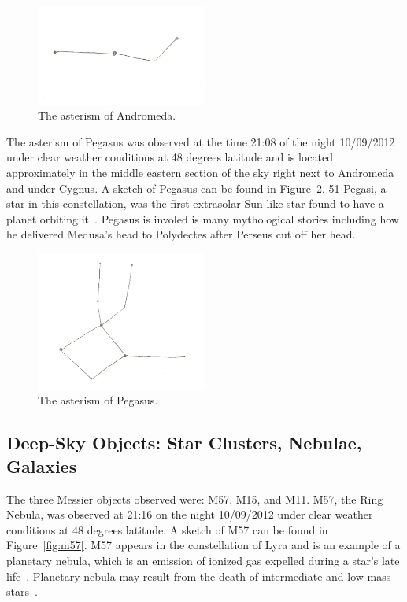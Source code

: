 \documentclass{article}
\begin{document}
\begin{figure}[h]
\centering
\includegraphics[width=0.5\textwidth]{images/andromeda}
\caption{The asterism of Andromeda.\label{fig:and}}
\end{figure}

The asterism of Pegasus was observed at the time 21:08 of the night 10/09/2012 under clear weather conditions at 48 degrees
latitude and is located approximately in the middle eastern section of the sky right next to Andromeda and under Cygnus. A sketch
of Pegasus can be found in Figure~\ref{fig:peg}. 51 Pegasi, a star in this constellation, was the first extrasolar Sun-like star found
to have a planet orbiting it~\cite{Mayor:1995}. Pegasus is involed is many mythological stories including how he delivered Medusa's
head to Polydectes after Perseus cut off her head.

\begin{figure}[h]
\centering
\includegraphics[width=0.5\textwidth]{images/pegasus}
\caption{The asterism of Pegasus.\label{fig:peg}}
\end{figure}

\subsection{Deep-Sky Objects: Star Clusters, Nebulae, Galaxies}

The three Messier objects observed were: M57, M15, and M11. M57, the Ring Nebula, was observed at 21:16 on the night 10/09/2012 
under clear weather conditions at 48 degrees latitude. A sketch of M57 can be found in Figure~\ref{fig:m57}. M57 appears in the
constellation of Lyra and is an example of a planetary nebula, which is an emission of ionized gas expelled during a star's late life~\cite{Soker:2009}. Planetary nebula may result from the death of intermediate and low mass stars~\cite{Costa:2009}.
\end{document}
